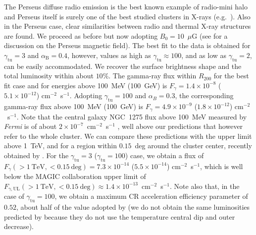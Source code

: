 \documentclass[traditabstract]{aa}
\newcommand{\rmn}{\mathrm}
\begin{document}
The Perseus diffuse radio emission is the best known example of radio-mini halo \citep{1990MNRAS.246..477P} and Perseus itself is surely one of the best studied clusters in X-rays (e.g.~\citealp{2003ApJ...590..225C,2006MNRAS.366..417F,2011arXiv1105.5025F}). Also in the Perseus case, clear similarities between radio and thermal X-ray structures are found. We proceed as before but now adopting $B_{0}=10$~$\mu$G (see \citealp{2010ApJ...710..634A,2011arXiv1111.5544M} for a discussion on the Perseus magnetic field). The best fit to the data is obtained for $\gamma_{\rmn{tu}}=3$ and $\alpha_{\rmn{B}}=0.4$, however, values as high as $\gamma_{\rmn{tu}} \approx 100$, and as low as $\gamma_{\rmn{tu}}=2$, can be easily accommodated. We recover the surface brightness shape and the total luminosity within about $10\%$. The gamma-ray flux within $R_{200}$ for the best fit case and for energies above 100~MeV (100~GeV) is $F_{\gamma} = 1.4 \times 10^{-8}$ ($5.1 \times 10^{-12}$) cm$^{-2}$~s$^{-1}$. Adopting $\gamma_{\rmn{tu}}=100$ and $\alpha_B=0.3$, the corresponding gamma-ray flux above 100~MeV (100~GeV) is $F_{\gamma} = 4.9 \times 10^{-9}$ ($1.8 \times 10^{-12}$) cm$^{-2}$~s$^{-1}$. Note that the central galaxy NGC~1275 flux above 100~MeV measured by \emph{Fermi} is of about $2 \times 10^{-7}$~cm$^{-2}$~s$^{-1}$ \citep{2009arXiv0904.1904T}, well above our predictions that however refer to the whole cluster. We can compare these predictions with the upper limit above 1~TeV, and for a region within $0.15$~deg around the cluster center, recently obtained by \cite{2011arXiv1111.5544M}. For the $\gamma_{\rmn{tu}}=3$ ($\gamma_{\rmn{tu}}=100$) case, we obtain a flux of $F_{\gamma}(>1~\rmn{TeV},<0.15~\rmn{deg}) = 7.3 \times 10^{-14}$ ($5.5 \times 10^{-14}$) cm$^{-2}$~s$^{-1}$, which is well below the MAGIC collaboration upper limit of $F_{\gamma,\rmn{UL}}(>1~\rmn{TeV},<0.15~\rmn{deg}) \approx 1.4 \times 10^{-13}$~cm$^{-2}$~s$^{-1}$. Note also that, in the case of $\gamma_{\rmn{tu}} = 100$, we obtain a maximum CR acceleration efficiency parameter of $0.52$, about half of the value adopted by \cite{2010MNRAS.409..449P} (we do not obtain the same luminosities predicted by \citealp{2010MNRAS.409..449P} because they do not use the temperature central dip and outer decrease).
\end{document}
